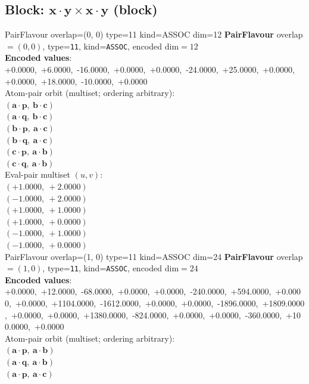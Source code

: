 \documentclass[a4paper,11pt]{article}
\newcommand{\pdcegfomjfhook}[2]{\mathbf{#1} \cdot \mathbf{#2}}
\begin{document}
\subsection{Block: $\pdcegfomjfhook{x}{y} \times \pdcegfomjfhook{x}{y}$  (block)}
    PairFlavour  overlap=(0, 0)  type=11  kind=ASSOC  dim=12
\textbf{PairFlavour} overlap$=(0, 0)$, type=\texttt{11}, kind=\texttt{ASSOC}, encoded dim$=12$\\
\textbf{      Encoded values}: +0.0000,\ +6.0000,\ -16.0000,\ +0.0000,\ +0.0000,\ -24.0000,\ +25.0000,\ +0.0000,\ +0.0000,\ +18.0000,\ -10.0000,\ +0.0000\\
\quad Atom-pair orbit (multiset; ordering arbitrary):\\
$(\pdcegfomjfhook{a}{p},\ \pdcegfomjfhook{b}{c})$\\
$(\pdcegfomjfhook{a}{q},\ \pdcegfomjfhook{b}{c})$\\
$(\pdcegfomjfhook{b}{p},\ \pdcegfomjfhook{a}{c})$\\
$(\pdcegfomjfhook{b}{q},\ \pdcegfomjfhook{a}{c})$\\
$(\pdcegfomjfhook{c}{p},\ \pdcegfomjfhook{a}{b})$\\
$(\pdcegfomjfhook{c}{q},\ \pdcegfomjfhook{a}{b})$\\
\quad Eval-pair multiset $(u, v)$:\\
$(+1.0000,\ +2.0000)$\\
$(-1.0000,\ +2.0000)$\\
$(+1.0000,\ +1.0000)$\\
$(+1.0000,\ +0.0000)$\\
$(-1.0000,\ +1.0000)$\\
$(-1.0000,\ +0.0000)$\\
    PairFlavour  overlap=(1, 0)  type=11  kind=ASSOC  dim=24
\textbf{PairFlavour} overlap$=(1, 0)$, type=\texttt{11}, kind=\texttt{ASSOC}, encoded dim$=24$\\
\textbf{      Encoded values}: +0.0000,\ +12.0000,\ -68.0000,\ +0.0000,\ +0.0000,\ -240.0000,\ +594.0000,\ +0.0000,\ +0.0000,\ +1104.0000,\ -1612.0000,\ +0.0000,\ +0.0000,\ -1896.0000,\ +1809.0000,\ +0.0000,\ +0.0000,\ +1380.0000,\ -824.0000,\ +0.0000,\ +0.0000,\ -360.0000,\ +100.0000,\ +0.0000\\
\quad Atom-pair orbit (multiset; ordering arbitrary):\\
$(\pdcegfomjfhook{a}{p},\ \pdcegfomjfhook{a}{b})$\\
$(\pdcegfomjfhook{a}{q},\ \pdcegfomjfhook{a}{b})$\\
$(\pdcegfomjfhook{a}{p},\ \pdcegfomjfhook{a}{c})$\\
\end{document}
